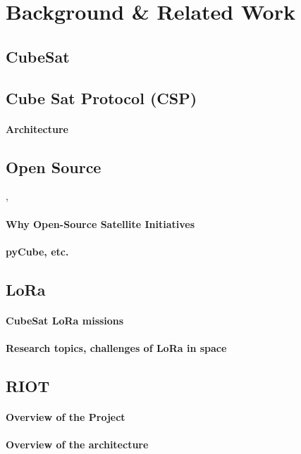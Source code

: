 \section{Background \& Related Work} 
\label{sec:background-related-work}

\subsection{CubeSat} 
\label{sec:cubesat}

\subsection{Cube Sat Protocol (CSP)} 
\label{sec:csp}

\paragraph*{Architecture}

\subsection{Open Source} \cite{shalashov2021OpenSourceCubeSatReview}, \cite{Holliday2019PyCubedAO}
\paragraph*{Why Open-Source Satellite Initiatives}
\paragraph*{pyCube, etc.}

\subsection{LoRa} \cite{saeed2020CubeSatReview} 
\label{sec:lora-cubesat}
\paragraph*{CubeSat LoRa missions}
\paragraph*{Research topics, challenges of LoRa in space}

\subsection{RIOT} \cite{baccelli2018riot}
\paragraph{Overview of the Project}
\paragraph{Overview of the architecture}

